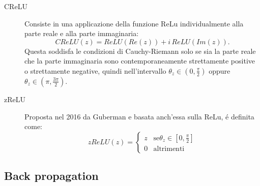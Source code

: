 \documentclass[a4paper,10pt]{article}
\begin{document}
\begin{description}
 \item[CReLU]
 Consiste in una applicazione della funzione ReLu individualmente alla parte reale e alla parte immaginaria:
 \begin{equation}
  CReLU\left( z\right) = ReLU\left( Re\left( z\right)\right) + i \, ReLU\left( Im\left( z\right)\right).
 \end{equation}
 Questa soddisfa le condizioni di Cauchy-Riemann solo se sia la parte reale che la parte immaginaria sono contemporaneamente strettamente positive o strettamente negative, quindi nell'intervallo $\theta_z \in \left( 0, \frac{\pi}{2}\right)$ oppure $\theta_z \in \left( \pi, \frac{ 3 \pi}{2}\right)$.
 
 \item[zReLU]
 Proposta nel 2016 da Guberman e basata anch'essa sulla ReLu, \'e definita come:
 \begin{equation}
   zReLU\left( z\right) = \begin{cases}
                                                                                               z & \mbox{se} \theta_z \in \left[ 0, \frac{ \pi}{2}\right] \\
                                                                                0 & \mbox{altrimenti}
                                                             
                                                     \end{cases}
 \end{equation}

\end{description}
 
 \subsection{Back propagation}
 
\end{document}
